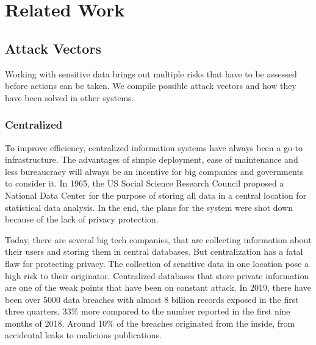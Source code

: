 
\chapter{Related Work}\label{chapter:relatedwork}
\section{Attack Vectors}
Working with sensitive data brings out multiple risks that have to be assessed before actions can be taken. We compile possible attack vectors and how they have been solved in other systems.

\subsection{Centralized}
To improve efficiency, centralized information systems have always been a go-to infrastructure. The advantages of simple deployment, ease of maintenance and less bureaucracy will always be an incentive for big companies and governments to consider it. In 1965, the US Social Science Research Council proposed a National Data Center for the purpose of storing all data in a central location for statistical data analysis. In the end, the plans for the system were shot down because of the lack of privacy protection.

Today, there are several big tech companies, that are collecting information about their users and storing them in central databases. But centralization has a fatal flaw for protecting privacy. The collection of sensitive data in one location pose a high risk to their originator. Centralized databases that store private information are one of the weak points that have been on constant attack. In 2019, there have been over 5000 data breaches with almost 8 billion records exposed in the first three quarters, 33\% more compared to the number reported in the first nine months of 2018. Around 10\% of the breaches originated from the inside, from accidental leaks to malicious publications.

